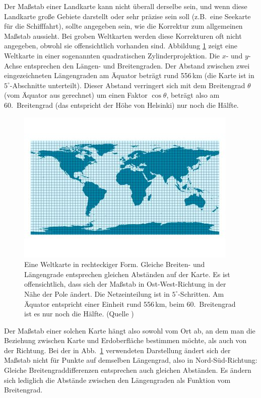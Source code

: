Der Ma\ss stab einer Landkarte kann nicht \"uberall derselbe sein, und wenn diese
Landkarte gro\ss e Gebiete darstellt oder sehr pr\"azise sein soll
(z.B.\ eine Seekarte f\"ur die Schifffahrt), sollte angegeben sein, wie die Korrektur zum
allgemeinen Ma\ss stab aussieht. Bei groben Weltkarten werden diese Korrekturen oft nicht
angegeben, obwohl sie offensichtlich vorhanden sind. Abbildung \ref{fig_Zylinder} zeigt eine Weltkarte
in einer sogenannten 
quadratischen Zylinderprojektion. Die $x$- und $y$-Achse entsprechen
den L\"angen- und Breitengraden. Der Abstand zwischen zwei eingezeichneten L\"angengraden am
\"Aquator betr\"agt rund 556\,km (die Karte ist in $5^\circ$-Abschnitte unterteilt). Dieser
Abstand verringert sich mit dem Breitengrad $\theta$ (vom \"Aquator aus gerechnet) um einen Faktor
$\cos \theta$, betr\"agt also am 60.\ Breitengrad (das entspricht der H\"ohe von Helsinki) nur noch die H\"alfte.   

\begin{figure}
\includegraphics[trim= 0cm 1.0cm 0.3cm 1.0cm,clip,scale=0.6]{./Bilder/Zylinderprojektion.jpg}
\caption{\label{fig_Zylinder}%
Eine Weltkarte in rechteckiger Form. Gleiche Breiten- und
L\"angengrade entsprechen gleichen Abst\"anden auf der Karte. Es ist offensichtlich, dass sich
der Ma\ss stab in Ost-West-Richtung in der N\"ahe der Pole \"andert. Die Netzeinteilung ist
in $5^\circ$-Schritten. Am \"Aquator entspricht einer Einheit rund 556\,km, beim $60$.\ Breitengrad
ist es nur noch die H\"alfte. (Quelle \cite{WikiNetz})}  
\end{figure}
 
Der Ma\ss stab einer solchen Karte h\"angt also sowohl vom Ort ab, an dem man 
die Beziehung zwischen Karte und Erdoberfl\"ache bestimmen m\"ochte, als auch von der
Richtung. Bei der in Abb.\ \ref{fig_Zylinder} verwendeten Darstellung \"andert sich der
Ma\ss stab nicht f\"ur Punkte auf demselben L\"angengrad, also in Nord-S\"ud-Richtung: 
Gleiche Breitengraddifferenzen entsprechen auch
gleichen Abst\"anden. Es \"andern sich lediglich die Abst\"ande zwischen den L\"angengraden 
als Funktion vom Breitengrad.  

